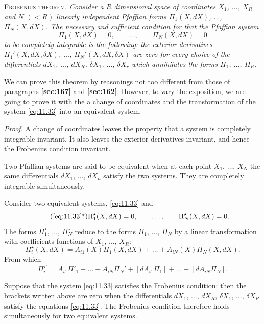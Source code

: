 \documentclass[leqno,11pt]{book}
\numberwithin{equation}{chapter}
\theoremstyle{shape1}
\theoremstyle{shapesmall}
\newcommand{\fsref}[1]{{\rm\textsection\textbf{\ref{sec:#1}}}}
\newcommand{\str}{^{\star}}
\newcommand{\somespace}{\vspace{9pt}}
\begin{document}
\somespace

\textsc{Frobenius theorem.} \emph{Consider a $R$ dimensional space of coordinates $X_{1}$, $\dots$, $X_{R}$ and $N$ $(<R)$ linearly independent Pfaffian forms $\Pi_{1}(X,dX)$, $\dots$, $\Pi_{N}(X,dX)$. The necessary and sufficient condition for that the Pfaffian system}
\begin{equation}
  \label{eq:11.33}
  \Pi_{1}(X,dX)=0,\qquad\dots,\qquad\Pi_{N}(X,dX)=0
\end{equation}
\emph{to be completely integrable is the following: the exterior derivatives $\Pi_{1}'(X,dX,\delta X)$, $\dots$, $\Pi_{N}'(X,dX, \delta X)$ are zero for every choice of the differentials $dX_{1}$, $\dots$, $dX_{R}$, $\delta X_{1}$, $\dots$, $\delta X_{r}$ which annihilates the forms $\Pi_{1}$, $\dots$, $\Pi_{R}$.}

\somespace

We can prove this theorem by reasonings not too different from those of paragraphs \fsref{167} and \fsref{162}. However, to vary the exposition, we are going to prove it with the a change of coordinates and the transformation of the system \eqref{eq:11.33} into an equivalent system.

\somespace

\emph{Proof.} A change of coordinates leaves the property that a system is completely integrable invariant. It also leaves the exterior derivatives invariant, and hence the Frobenius condition invariant.

Two Pfaffian systems are said to be equivalent when at each point $X_{1}$, $\dots$, $X_{N}$ the same differentials $dX_{1}$, $\dots$, $dX_{n}$ satisfy the two systems. They are completely integrable simultaneously.

Consider two equivalent systems, \eqref{eq:11.33} and 
\begin{equation}
  \label{eq:11.33*}\tag{\ref{eq:11.33}$\str$}
  \Pi\str_{1}(X,dX)=0,\qquad\dots,\qquad\Pi\str_{N}(X,dX)=0.
\end{equation}
The forms $\Pi\str_{1}$, $\dots$, $\Pi\str_{N}$ reduce to the forms $\Pi_{1}$, $\dots$, $\Pi_{N}$ by a linear transformation with coefficients functions of $X_{1}$, $\dots$, $X_{R}$:
\[
\Pi\str_{i}(X,dX)=A_{i1}(X)\Pi_{1}(X,dX)+\dots+A_{iN}(X)\Pi_{N}(X,dX).
\]
From which 
\[
\Pi_{i}^{\star\prime}=A_{i1}\Pi'_{1}+\dots+A_{iN}\Pi_{N}'+[dA_{i1}\Pi_{1}]+\dots+[dA_{iN}\Pi_{N}].
\]

Suppose that the system \eqref{eq:11.33} satisfies the Frobenius condition: then the brackets written above are zero when the differentials $dX_{1}$, $\dots$, $dX_{R}$, $\delta X_{1}$, $\dots$, $\delta X_{R}$ satisfy the equations \eqref{eq:11.33}. The Frobenius condition therefore holds simultaneously for two equivalent systems.
\end{document}
